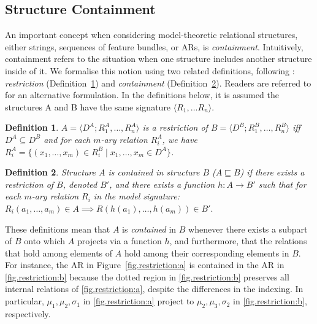 \documentclass{CUP-JNL-PHO}%
\theoremstyle{definition}
\numberwithin{equation}{section}
\theoremstyle{definition}
\newtheorem{definition}{Definition}[section]
\begin{document}
\subsection{Structure Containment}
%
An important concept when considering model-theoretic relational
structures, either strings, sequences of feature bundles, or ARs, is
\textit{containment}. Intuitively, containment refers to the situation
when one structure includes another structure inside of it. We
formalise this notion using two related definitions, following
\citet{chandleeBufia2019}: \textit{restriction}
(Definition~\ref{def.res}) and \textit{containment}
(Definition~\ref{def.contain}). Readers are referred to
\citet{rogers.lambert2019mol} for an alternative formulation. In the
definitions below, it is assumed the structures A and B have the same
signature $\langle R_1, \ldots R_n \rangle$.

\begin{definition}
	\label{def.res}
	\textit{ $A= \langle D^A; R^A_1, \ldots, R^A_n \rangle$ is a \emph{restriction}
		of $B
		= \langle D^B; R^B_1, \ldots, R^B_n \rangle$ iff $D^A \subseteq D^B$ and for
		each $m$-ary relation $R^A_i$, we have $R^A_i = \{(x_1, \ldots, x_m) \in R^B_i \mid x_1, \ldots, x_m \in D^A\}$. }
\end{definition}

\begin{definition}
	\label{def.contain}
	\textit{Structure $A$ is \emph{contained} in structure $B$
		($A \sqsubseteq B$) if there exists a restriction of $B$, denoted
		$B'$, and there exists a function $h:A \rightarrow B'$ such that for
		each $m$-ary relation $R_i$ in the model signature:
		\(R_i(a_1, \ldots, a_m) \in A \implies R(h(a_1), \ldots, h(a_m)) \in
		B'.\)}
\end{definition}

These definitions mean that $A$ is \textit{contained} in $B$ whenever
there exists a subpart of $B$ onto which \(A\) projects via a function
\(h\), and furthermore, that the relations that hold among elements of
\(A\) hold among their corresponding elements in \(B\). For instance,
the AR in Figure~\ref{fig.restriction:a} is contained in the AR
in \ref{fig.restriction:b} because the dotted region in
\ref{fig.restriction:b} preserves all internal relations of
\ref{fig.restriction:a}, despite the differences in the
indexing. In particular, $\mu_1, \mu_2, \sigma_1$ in
\ref{fig.restriction:a} project to $\mu_2, \mu_3, \sigma_2$ in
\ref{fig.restriction:b}, respectively.
\end{document}
